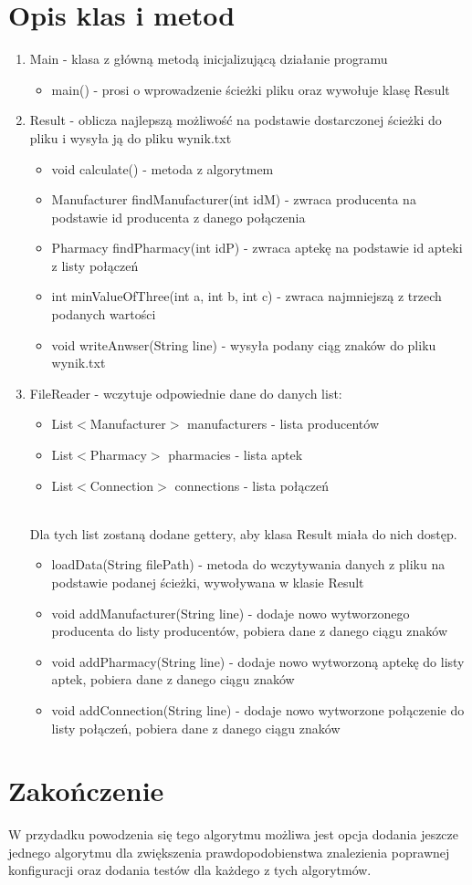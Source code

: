 \documentclass{article}
\begin{document}
\section{Opis klas i metod}
\begin{enumerate}
    \item Main - klasa z główną metodą inicjalizującą działanie programu
    \begin{itemize}
        \item main() - prosi o wprowadzenie ścieżki pliku oraz wywołuje klasę Result 
    \end{itemize}
    \item Result - oblicza najlepszą możliwość na podstawie dostarczonej ścieżki do pliku i wysyła ją do pliku wynik.txt
    \begin{itemize}
        \item void calculate() - metoda z algorytmem 
        \item Manufacturer findManufacturer(int idM) - zwraca producenta na podstawie id producenta z danego połączenia
        \item Pharmacy findPharmacy(int idP) - zwraca aptekę na podstawie id apteki z listy połączeń
        \item int minValueOfThree(int a, int b, int c) - zwraca najmniejszą z trzech podanych wartości
        \item void writeAnwser(String line) - wysyła podany ciąg znaków do pliku wynik.txt
    \end{itemize}
    \item FileReader - wczytuje odpowiednie dane do danych list: 
    \begin{itemize}
        \item List$<$Manufacturer$>$ manufacturers - lista producentów          \item List$<$Pharmacy$>$ pharmacies - lista aptek
        \item List$<$Connection$>$ connections - lista połączeń
    \end{itemize}
    \\Dla tych list zostaną dodane gettery, aby klasa Result miała do nich dostęp.
     \begin{itemize}
        \item loadData(String filePath) - metoda do wczytywania danych z pliku na podstawie podanej ścieżki, wywoływana w klasie Result
        \item void addManufacturer(String line) - dodaje nowo wytworzonego producenta do listy producentów, pobiera dane z danego ciągu znaków
        \item void addPharmacy(String line) - dodaje nowo wytworzoną aptekę do listy aptek, pobiera dane z danego ciągu znaków
        \item void addConnection(String line) - dodaje nowo wytworzone połączenie do listy połączeń, pobiera dane z danego ciągu znaków
    \end{itemize}
\end{enumerate}

\section{Zakończenie}
W przydadku powodzenia się tego algorytmu możliwa jest opcja dodania jeszcze jednego algorytmu dla zwiększenia prawdopodobienstwa znalezienia poprawnej konfiguracji oraz dodania testów dla każdego z tych algorytmów.
\end{document}

